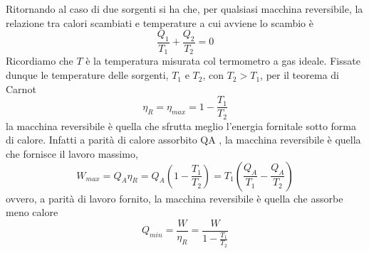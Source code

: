 \documentclass[class=book, crop=false, oneside, 12pt]{standalone}
\begin{document}
Ritornando al caso di due sorgenti si ha che, per qualsiasi macchina reversibile, la relazione tra calori scambiati e temperature a cui avviene lo scambio è
\begin{equation}
    \frac{Q_1}{T_1} + \frac{Q_2}{T_2} = 0
\end{equation}
Ricordiamo che \(T\) è la temperatura misurata col termometro a gas ideale. 
Fissate dunque le temperature delle sorgenti, \(T_1\) e \(T_2\), con \(T_2 > T_1\), per il teorema di Carnot
\begin{equation}
    \eta_R = \eta_{max} = 1- \frac{T_1}{T_2}
\end{equation}
la macchina reversibile è quella che sfrutta meglio l'energia fornitale sotto forma di calore.
Infatti a parità di calore assorbito QA , la macchina reversibile è quella che fornisce il lavoro massimo, 
\begin{equation}
    W_{max} = Q_A \eta_R = Q_A \left(1 - \frac{T_1}{T_2}\right) = T_1 \left(\frac{Q_A}{T_1} - \frac{Q_A}{T_2}\right)
\end{equation}
ovvero, a parità di lavoro fornito, la macchina reversibile è quella che assorbe meno calore
\begin{equation}
    Q_{min} = \frac{W}{\eta_R} = \frac{W}{1- \frac{T_1}{T_2}}
\end{equation}
\end{document}
